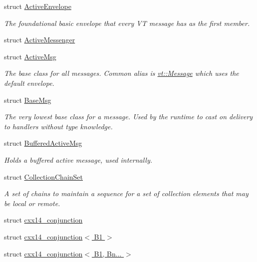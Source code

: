 \begin{DoxyCompactItemize}
\item 
struct \hyperlink{structvt_1_1messaging_1_1_active_envelope}{Active\+Envelope}
\begin{DoxyCompactList}\small\item\em The foundational basic envelope that every VT message has as the first member. \end{DoxyCompactList}\item 
struct \hyperlink{structvt_1_1messaging_1_1_active_messenger}{Active\+Messenger}
\item 
struct \hyperlink{structvt_1_1messaging_1_1_active_msg}{Active\+Msg}
\begin{DoxyCompactList}\small\item\em The base class for all messages. Common alias is {\ttfamily \hyperlink{namespacevt_a3a3ddfef40b4c90915fa43cdd5f129ea}{vt\+::\+Message}} which uses the default envelope. \end{DoxyCompactList}\item 
struct \hyperlink{structvt_1_1messaging_1_1_base_msg}{Base\+Msg}
\begin{DoxyCompactList}\small\item\em The very lowest base class for a message. Used by the runtime to cast on delivery to handlers without type knowledge. \end{DoxyCompactList}\item 
struct \hyperlink{structvt_1_1messaging_1_1_buffered_active_msg}{Buffered\+Active\+Msg}
\begin{DoxyCompactList}\small\item\em Holds a buffered active message, used internally. \end{DoxyCompactList}\item 
struct \hyperlink{classvt_1_1messaging_1_1_collection_chain_set}{Collection\+Chain\+Set}
\begin{DoxyCompactList}\small\item\em A set of chains to maintain a sequence for a set of collection elements that may be local or remote. \end{DoxyCompactList}\item 
struct \hyperlink{structvt_1_1messaging_1_1cxx14__conjunction}{cxx14\+\_\+conjunction}
\item 
struct \hyperlink{structvt_1_1messaging_1_1cxx14__conjunction_3_01_b1_01_4}{cxx14\+\_\+conjunction$<$ B1 $>$}
\item 
struct \hyperlink{structvt_1_1messaging_1_1cxx14__conjunction_3_01_b1_00_01_bn_8_8_8_01_4}{cxx14\+\_\+conjunction$<$ B1, Bn... $>$}

\end{DoxyCompactItemize}
